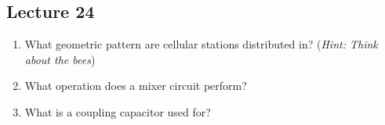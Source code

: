 \subsection*{Lecture 24}

\begin{enumerate}
  \item What geometric pattern are cellular stations distributed in? (\textit{Hint: Think about the bees})
  \item What operation does a mixer circuit perform?
  \item What is a coupling capacitor used for?
\end{enumerate}